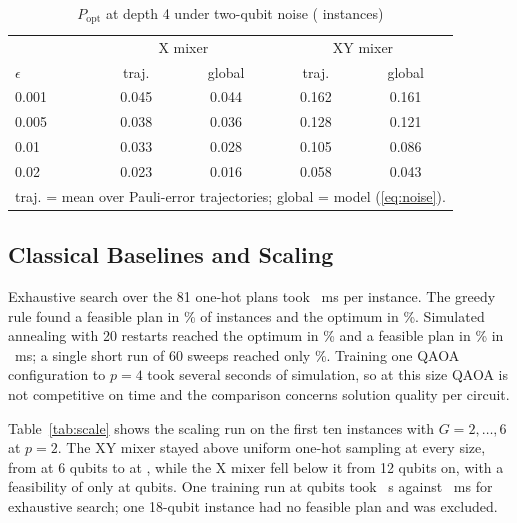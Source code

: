 \documentclass[conference]{IEEEtran}
\begin{document}
\begin{table}[t]
\caption{$P_{\mathrm{opt}}$ at depth 4 under two-qubit noise (\TrajInst{} instances)}
\label{tab:noise}
\centering
\footnotesize
\setlength{\tabcolsep}{4pt}
\begin{tabular}{lcccc}
\toprule
 & \multicolumn{2}{c}{X mixer} & \multicolumn{2}{c}{XY mixer}\\
$\epsilon$ & traj. & global & traj. & global\\
\midrule
0.001 & 0.045 & 0.044 & 0.162 & 0.161\\
0.005 & 0.038 & 0.036 & 0.128 & 0.121\\
0.01 & 0.033 & 0.028 & 0.105 & 0.086\\
0.02 & 0.023 & 0.016 & 0.058 & 0.043\\
\bottomrule
\multicolumn{5}{l}{\scriptsize traj. = mean over \TrajRuns{} Pauli-error trajectories; global = model (\ref{eq:noise}).}\\
\end{tabular}
\end{table}

\subsection{Classical Baselines and Scaling}
Exhaustive search over the 81 one-hot plans took \ExactMs~ms per instance. The greedy rule found a feasible plan in \GreedyFeas\% of instances and the optimum in \GreedyOpt\%. Simulated annealing with 20 restarts reached the optimum in \SATunedOpt\% and a feasible plan in \SATunedFeas\% in \SATunedMs~ms; a single short run of 60 sweeps reached only \SAOpt\%. Training one QAOA configuration to $p=4$ took several seconds of simulation, so at this size QAOA is not competitive on time and the comparison concerns solution quality per circuit.

Table~\ref{tab:scale} shows the scaling run on the first ten instances with $G=2,\dots,6$ at $p=2$. The XY mixer stayed above uniform one-hot sampling at every size, from \ScaleXYtwo{} at 6 qubits to \ScaleXYsix{} at \ScaleMaxQ, while the X mixer fell below it from 12 qubits on, with a feasibility of only \ScaleXfeasSix{} at \ScaleMaxQ{} qubits. One training run at \ScaleMaxQ{} qubits took \ScaleXYmsSix~s against \ScaleExactSix~ms for exhaustive search; one 18-qubit instance had no feasible plan and was excluded.
\end{document}

